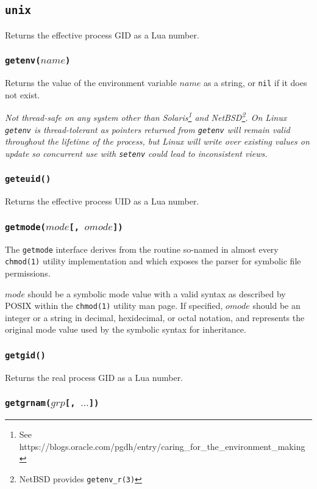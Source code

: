 \documentclass[11pt, oneside]{memoir}
\newcommand*{\nil}[0]{\texttt{nil}\xspace}
\newcommand*{\syscall}[1]{\texttt{#1}\xspace}
\newcommand*{\fn}[1]{\texttt{#1}\xspace}
\newcounter{toccols}
\newenvironment{Module}[1]{
	\subsection{\texttt{#1}}
	\addtocontents{toc}{
		\protect\begin{multicols}{\value{toccols}}
	}
}{
	\addtocontents{toc}{\protect\end{multicols}}
}
\begin{document}
\begin{Module}{unix}
Returns the effective process GID as a Lua number.

\subsubsection[\fn{getenv}]{\fn{getenv($name$)}}

Returns the value of the environment variable $name$ as a string, or \nil if it does not exist.

\emph{Not thread-safe on any system other than Solaris\footnote{See https://blogs.oracle.com/pgdh/entry/caring\_for\_the\_environment\_making} and NetBSD\footnote{NetBSD provides \syscall{getenv\_r(3)}}. On Linux \fn{getenv} is thread-tolerant as pointers returned from \syscall{getenv} will remain valid throughout the lifetime of the process, but Linux will write over existing values on update so concurrent use with \fn{setenv} could lead to inconsistent views.}

\subsubsection[\fn{geteuid}]{\fn{geteuid()}}

Returns the effective process UID as a Lua number.

\subsubsection[\fn{getmode}]{\fn{getmode($mode$[, $omode$])}}

The \fn{getmode} interface derives from the routine so-named in almost every \texttt{chmod(1)} utility implementation and which exposes the parser for symbolic file permissions.

$mode$ should be a symbolic mode value with a valid syntax as described by POSIX within the \syscall{chmod(1)} utility man page. If specified, $omode$ should be an integer or a string in decimal, hexidecimal, or octal notation, and represents the original mode value used by the symbolic syntax for inheritance.

\subsubsection[\fn{getgid}]{\fn{getgid()}}

Returns the real process GID as a Lua number.

\subsubsection[\fn{getgrnam}]{\fn{getgrnam($grp$[, $\ldots$])}}


\end{Module}
\end{document}
